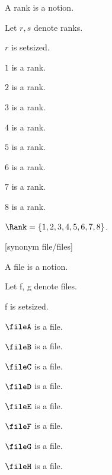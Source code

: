 \begin{forthel}
    \begin{signature} A rank is a notion. \end{signature}
    Let $r, s$ denote ranks.

    \begin{axiom} $r$ is setsized. \end{axiom}

    \begin{signature} $1$ is a rank. \end{signature}
    \begin{signature} $2$ is a rank. \end{signature}
    \begin{signature} $3$ is a rank. \end{signature}
    \begin{signature} $4$ is a rank. \end{signature}
    \begin{signature} $5$ is a rank. \end{signature}
    \begin{signature} $6$ is a rank. \end{signature}
    \begin{signature} $7$ is a rank. \end{signature}
    \begin{signature} $8$ is a rank. \end{signature}

    \begin{definition} $\Rank = \{1,2,3,4,5,6,7,8\}$. \end{definition}

    [synonym file/files]
    \begin{signature} A file is a notion. \end{signature}
    Let f, g denote files.

    \begin{axiom} f is setsized. \end{axiom}

    \begin{signature} $\fileA$ is a file. \end{signature}
    \begin{signature} $\fileB$ is a file. \end{signature}
    \begin{signature} $\fileC$ is a file. \end{signature}
    \begin{signature} $\fileD$ is a file. \end{signature}
    \begin{signature} $\fileE$ is a file. \end{signature}
    \begin{signature} $\fileF$ is a file. \end{signature}
    \begin{signature} $\fileG$ is a file. \end{signature}
    \begin{signature} $\fileH$ is a file. \end{signature}


\end{forthel}
